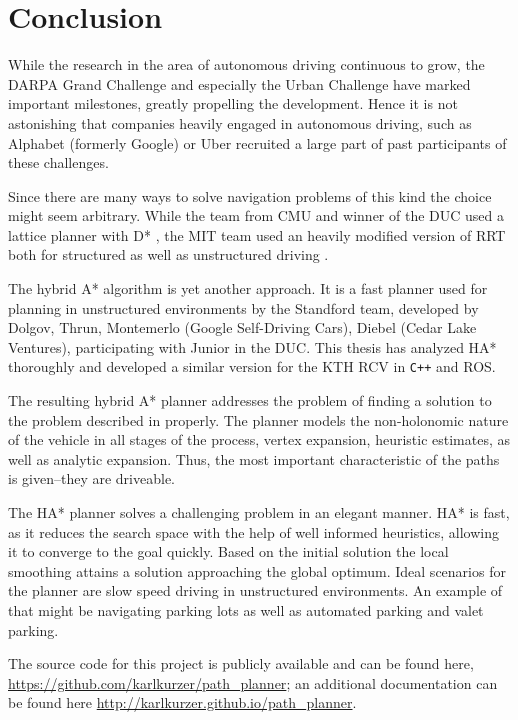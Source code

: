 \chapter{Conclusion}
While the research in the area of autonomous driving continuous to grow, the DARPA Grand Challenge and especially the Urban Challenge have marked important milestones, greatly propelling the development. Hence it is not astonishing that companies heavily engaged in autonomous driving, such as Alphabet (formerly Google) or Uber recruited a large part of past participants of these challenges.

Since there are many ways to solve navigation problems of this kind the choice might seem arbitrary. While the team from CMU and winner of the DUC used a lattice planner with D* \cite{Ferguson.2008b,Likhachev.2005}, the MIT team used an heavily modified version of RRT both for structured as well as unstructured driving \cite{Kuwata.2008}.

The hybrid A* algorithm is yet another approach. It is a fast planner used for planning in unstructured environments by the Standford team, developed by Dolgov, Thrun, Montemerlo (Google Self-Driving Cars), Diebel (Cedar Lake Ventures), participating with Junior in the DUC.
This thesis has analyzed HA* thoroughly and developed a similar version for the KTH RCV in \texttt{C++} and ROS.

The resulting hybrid A* planner addresses the problem of finding a solution to the problem described in  properly. The planner models the non-holonomic nature of the vehicle in all stages of the process, vertex expansion, heuristic estimates, as well as analytic expansion. Thus, the most important characteristic of the paths is given--they are driveable. 

The HA* planner solves a challenging problem in an elegant manner. HA* is fast, as it reduces the search space with the help of well informed heuristics, allowing it to converge to the goal quickly. Based on the initial solution the local smoothing attains a solution approaching the global optimum. Ideal scenarios for the planner are slow speed driving in unstructured environments. An example of that might be navigating parking lots as well as automated parking and valet parking.

The source code for this project is publicly available and can be found here, \url{https://github.com/karlkurzer/path_planner}; an additional documentation can be found here \url{http://karlkurzer.github.io/path_planner}.